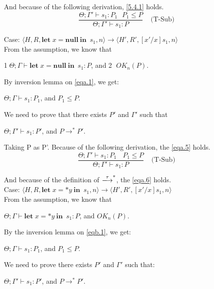 \documentclass[english]{jssst_ppl} %
\newcommand\LET{\mathbf{let}\;}
\newcommand\IN{\mathbf{in}\;}
\newcommand\Rtab{\; \; \; \;}
\newcommand\NULL{\mathbf{null}}
\theoremstyle{definition}
\begin{document}
And because of the following derivation, \eqref{5.4.1} holds.
$$
  \frac{\Theta; \Gamma' \vdash s_{1} : P_{1} \ \ \ P_{1} \le P}
  {\Theta; \Gamma' \vdash s_{1} : P}
  \Rtab \mbox{(T-Sub)}
$$

\noindent Case: $\langle H, R, \LET x = \NULL \  \IN \  s_{1}, n \rangle \rightarrow \langle H', R', [x'/x]s_{1}, n \rangle $\\

From the assumption, we know that
\begin{center}
\textcircled{1}$\Theta; \Gamma \vdash \LET x = \NULL \  \IN \ s_{1} : P$, and \textcircled{2} $OK_{n}(P)$.
\end{center}

By inversion lemma on \eqref{eqa.1}, we get:
\begin{center}
$\Theta; \Gamma \vdash s_{1} : P_{1}$, and $ P_{1} \le P$.
\end{center}

We need to prove that there exists $P'$ and $\Gamma'$ such that
\begin{center}
$\Theta; \Gamma' \vdash s_{1} : P'$, and $P \rightarrow^{*} P'$.
\end{center}

Taking P as P'. Because of the following derivation, the \eqref{eqa.5} holds.
$$
  \frac{\Theta; \Gamma' \vdash s_{1} : P_{1} \ \ \ \ P_{1} \le P}
  {\Theta; \Gamma' \vdash s_{1} : P}
  \Rtab \mbox{(T-Sub)}
$$

And because of the definition of $\xlongrightarrow{\tau}^{*}$, the \eqref{eqa.6} holds. \\

\noindent Case: $\langle H, R, \LET x = *y \  \IN \  s_{1}, n \rangle \rightarrow \langle H', R', [x'/x]s_{1}, n \rangle $\\

From the assumption, we know that
\begin{center}
$\Theta; \Gamma \vdash \LET x = *y \  \IN \  s_{1} : P$, and $OK_{n}(P)$.
\end{center}

By the inversion lemma on \eqref{eqb.1}, we get:
\begin{center}
$\Theta; \Gamma \vdash s_{1} : P_{1}$, and $P_{1} \le P$.
\end{center}

We need to prove there exists $P'$ and $\Gamma'$ such that:
\begin{center}
$\Theta; \Gamma' \vdash s_{1} : P'$, and $P \rightarrow^{*} P'$.
\end{center}
\end{document}
